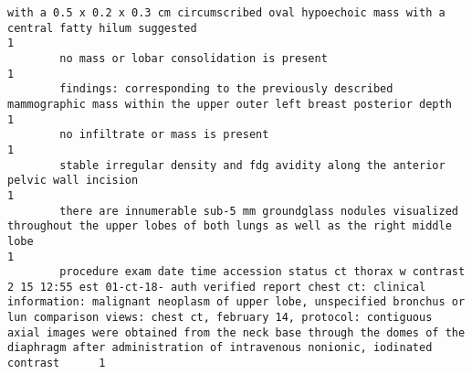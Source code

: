 \documentclass[11pt]{article}
\begin{document}
\begin{Verbatim}[commandchars=\\\{\}]
        with a 0.5 x 0.2 x 0.3 cm circumscribed oval hypoechoic mass with a central fatty hilum suggested                                                                                                                                                                                                                                                                                                                               1
        no mass or lobar consolidation is present                                                                                                                                                                                                                                                                                                                                                                                       1
        findings: corresponding to the previously described mammographic mass within the upper outer left breast posterior depth                                                                                                                                                                                                                                                                                                        1
        no infiltrate or mass is present                                                                                                                                                                                                                                                                                                                                                                                                1
        stable irregular density and fdg avidity along the anterior pelvic wall incision                                                                                                                                                                                                                                                                                                                                                1
        there are innumerable sub-5 mm groundglass nodules visualized throughout the upper lobes of both lungs as well as the right middle lobe                                                                                                                                                                                                                                                                                         1
        procedure exam date time accession status ct thorax w contrast 2 15 12:55 est 01-ct-18- auth verified report chest ct: clinical information: malignant neoplasm of upper lobe, unspecified bronchus or lun comparison views: chest ct, february 14, protocol: contiguous axial images were obtained from the neck base through the domes of the diaphragm after administration of intravenous nonionic, iodinated contrast      1

\end{Verbatim}
\end{document}
